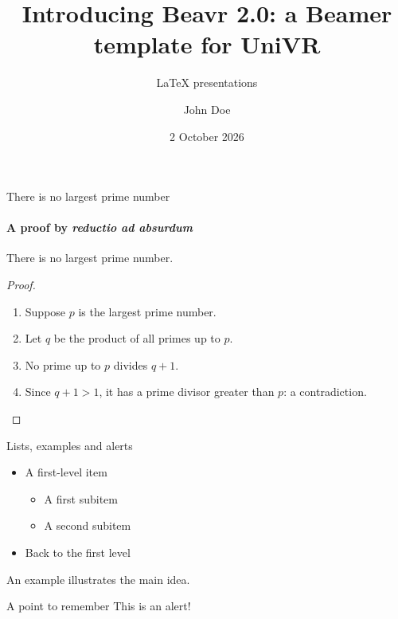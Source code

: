 \documentclass{beamer} %
\title[Introducing Beavr 2.0]{Introducing Beavr 2.0: a Beamer template for UniVR}
\subtitle{\LaTeX{} presentations}
\author[J. Doe]{John Doe}
\date{2 October 2026} %
\begin{document}
\begin{frame}
  \titlepage
\end{frame}

\begin{frame}{There is no largest prime number}
  \framesubtitle{A proof by \textit{reductio ad absurdum}}
  \begin{theorem}
    There is no largest prime number.
  \end{theorem}
  \begin{proof}
    \begin{enumerate}
      \item Suppose $p$ is the largest prime number.
      \item Let $q$ be the product of all primes up to $p$.
      \item No prime up to $p$ divides $q+1$.
      \item Since $q+1>1$, it has a prime divisor greater than $p$:
        a contradiction.
    \end{enumerate}
  \end{proof}
\end{frame}

\begin{frame}{Lists, examples and alerts}
  \begin{itemize}
    \item A first-level item
      \begin{itemize}
        \item A first subitem
        \item A second subitem
      \end{itemize}
    \item Back to the first level
  \end{itemize}
  \begin{example}[Scenario 1]
    An example illustrates the main idea.
  \end{example}
  \begin{alertblock}{A point to remember}
    This is an alert!
  \end{alertblock}
\end{frame}
\end{document}

